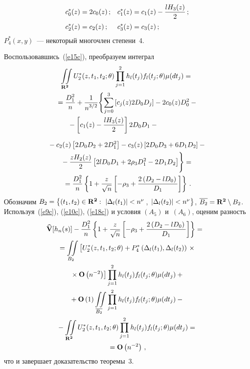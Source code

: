 \begin{multicols}{2}
   \noindent
   \begin{align*} 
c_0^*(z)&=2c_0(z)\,; & c_1^*(z)&=c_1(z)-\displaystyle\frac{\displaystyle l H_3(z)\mathstrut}{\displaystyle 2\mathstrut}\,;\\
c_2^*(z)&=c_2(z)\,; &c_3^*(z)&=c_3(z)\,;
\end{align*}
   $P_4^*(x,y)$~--- некоторый многочлен степени~4.

   Воспользовавшись~(\ref{e15c}), преобразуем интеграл
   \begin{multline*} 
\iint\limits_{\bf R^2} U_2^*(z,t_1,t_2;\theta)
      \prod_{j=1}^2 h_l(t_j) f_l(t_j;\theta) \mu(dt_j)={}
\\
{} =\displaystyle\frac{\displaystyle D_1^2\mathstrut}{\displaystyle n\mathstrut}+\displaystyle\frac{\displaystyle 1\mathstrut}{\displaystyle n^{3/2}\mathstrut}
      \Biggl\{ \sum_{j=0}^3 \left[c_j(z) 2D_0D_j \right]-
      2c_0(z)D_0^2-{}\\
      {}- \left[c_1(z)-\displaystyle\frac{\displaystyle lH_3(z)\mathstrut}{\displaystyle 2\mathstrut} \right]
       2D_0D_1-\hspace*{40pt}
{}
      \end{multline*}
      
      
  \noindent
      \begin{multline}
{} -c_2(z) \left[2D_0D_2+2D_1^2 \right]-
      c_3(z) \left[2D_0D_3+6D_1D_2 \right]-
   {}\\
{} -\displaystyle\frac{\displaystyle zH_2(z)\mathstrut}{\displaystyle 2\mathstrut} \left[2lD_0D_1+2\rho_3D_1^2-2D_1 D_2 \right]
      \Biggr\}={}\\
      {}=\displaystyle\frac{\displaystyle D_1^2\mathstrut}{\displaystyle n\mathstrut}\left\{1+
      \displaystyle\frac{\displaystyle z\mathstrut}{\displaystyle \sqrt{n}\mathstrut} \left[-\rho_3+
      \displaystyle\frac{\displaystyle 2\left(D_2-lD_0 \right)\mathstrut}{\displaystyle D_1\mathstrut} \right] \right\}\,.
   \label{e18c}
\end{multline}
   Обозначим
   $B_2=\left\{\left(t_1,t_2\right)\in {\bf R^2}:~
    \left|\Delta_l(t_1)\right|<n^\nu\right.$, $\left.\left|\Delta_l(t_2)\right|<n^\nu 
    \vphantom{\bf R^2}\right\}$,
$\overline{B_2}={\bf R^2}\setminus B_2$.
    Используя~(\ref{e9c}), (\ref{e10c}), (\ref{e18c}) и 
условия $(A_5)$ и~$(A_6)$, оценим разность
   \begin{multline*}  
\!\!\!\widehat{\bf {V}}[h_n(s)]-\fr{D_1^2}{n}\left\{1+
      \fr{z}{\sqrt{n}} \left[-\rho_3+
      \fr{2\left(D_2-lD_0 \right)}{D_1} \right] \right\}=
   {}\hspace*{-0.5pt}\\
{} =\iint\limits_{B_2} \left[\vphantom{n^{-2}}
U_2^*(z,t_1,t_2;\theta)+
        P_4^* \left(\Delta_l(t_1),\Delta_l(t_2)\right)\right.\times{}\\
\left.{}        \times
        {\bf O}\left(n^{-2}\right)\right]
      \prod_{j=1}^2 h_l(t_j) f_l(t_j;\theta) \mu(dt_j)+
   {}\\
{}   +{\bf O}\left(1\right)\iint\limits_{\overline{B_2}}
        \prod_{j=1}^2 h_l(t_j) f_l(t_j;\theta) \mu(dt_j)-{}
        \\
        {}-
        \iint\limits_{\bf R^2}U_2^*(z,t_1,t_2;\theta)
        \prod_{j=1}^2 h_l(t_j) f_l(t_j;\theta) \mu(dt_j)={}\\
        {}=
        {\bf O}\left(n^{-2}\right)\,,
   \end{multline*}
   что и завершает доказательство теоремы~3.


\end{multicols}
